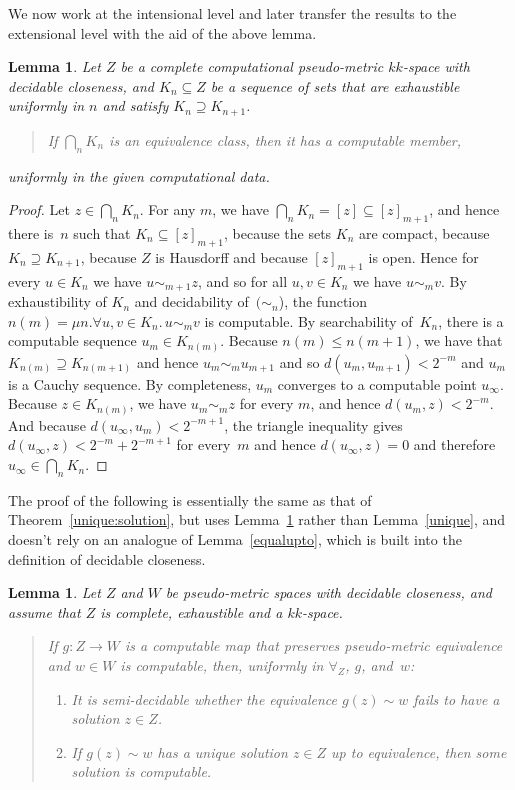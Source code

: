 \documentclass[10pt]{article}
\newtheorem{lemma}[cor]{Lemma}
\begin{document}
\pagebreak[3] We now work at the intensional level and later transfer
the results to the extensional level with the aid of the above lemma.
\begin{lemma} \label{unique:bis:bis} Let $Z$ be a complete
  computational pseudo-metric $kk$-space with decidable closeness, and
  $K_n \subseteq Z$ be a sequence of sets that are exhaustible
  uniformly in $n$ and satisfy $K_n \supseteq K_{n+1}$.
  \begin{quote} If $\bigcap_n K_n$ is an equivalence class, then it
    has a computable member,
  \end{quote}
uniformly in the given computational data.
\end{lemma}
\noindent
\begin{proof}
  Let $z \in \bigcap_n K_n$. For any $m$, we
  have $\bigcap_n K_n = [z] \subseteq [z]_{m+1}$, and hence there is~$n$
  such that $K_n \subseteq [z]_{m+1}$, because the sets $K_n$ are compact,
  because $K_n \supseteq K_{n+1}$, because $Z$ is Hausdorff and
  because $[z]_{m+1}$ is open.  Hence for every $u \in K_n$ we have $u
  \sim_{m+1} z$, and so for all $u,v \in K_n$ we have $u \sim_m v$. By
  exhaustibility of $K_n$ and decidability of~$(\sim_n$), the function
  $n(m) = \mu n. \forall u,v \in K_n.\, u \sim_m v$
  is computable. By searchability of~$K_n$, there is a computable
  sequence $u_m \in K_{n(m)}$. Because $n(m) \le n(m+1)$, we have that
  $K_{n(m)} \supseteq K_{n(m+1)}$ and hence $u_m \sim_m u_{m+1}$ and
  so $d(u_m,u_{m+1}) < 2^{-m}$ and $u_m$ is a Cauchy sequence. By
  completeness, $u_m$ converges to a computable point $u_\infty$.
  Because $z \in K_{n(m)}$, we have $u_m \sim_m z$ for every $m$, and
  hence $d(u_m,z) < 2^{-m}$. And because $d(u_\infty,u_m) < 2^{-m+1}$,
  the triangle inequality gives $d(u_\infty,z) < 2^{-m} + 2^{-m+1}$
  for every~$m$ and hence $d(u_\infty,z)=0$ and therefore $u_\infty
  \in \bigcap_n K_n$.
\end{proof}
The proof of the following is essentially the same as that of
Theorem~\ref{unique:solution}, but uses Lemma~\ref{unique:bis:bis}
rather than Lemma~\ref{unique}, and doesn't rely on an analogue of
Lemma~\ref{equalupto}, which is built into the definition of decidable
closeness.
\pagebreak[3]
\begin{lemma} \label{unique:solution:bis} Let $Z$ and $W$ be
  pseudo-metric spaces with decidable closeness, and assume that $Z$
  is complete, exhaustible and a $kk$-space.  
\begin{quote}
If $g\colon Z \to W$ is
  a computable map that preserves pseudo-metric equivalence and $w \in
  W$ is computable, then, uniformly in $\forall_Z$, $g$, and~$w$:
\begin{enumerate}
\item \label{unique:solution:bis:2} It is semi-decidable whether the
  equivalence $g(z) \sim w$ fails to have a solution $z \in Z$.
\item \label{unique:solution:bis:1} If $g(z) \sim w$ has a unique solution
  $z \in Z$ up to equivalence, then some solution is computable. 
\end{enumerate}
\end{quote}
\end{lemma}
\end{document}
